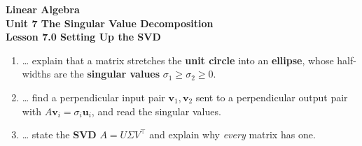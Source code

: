 \documentclass[10pt]{article}
\begin{document}
\vspace{-0.8in}

\begin{center}
  {\color{white}\textbf{\LARGE Linear Algebra}}\\[4pt]
  {\color{blushmid}\large\textbf{Unit 7 \quad The Singular Value Decomposition}}\\[6pt]
  {\color{white}\textbf{\large Lesson 7.0 \quad Setting Up the SVD}}
\end{center}

\vspace{0.22in}
\namedateperiod
\vspace{0.18in}

\begin{learningtargetbox}
\small
\begin{enumerate}[leftmargin=1.5em, itemsep=5pt]
  \item \ldots{} explain that a matrix stretches the \textbf{unit circle} into an \textbf{ellipse}, whose half-widths are the \textbf{singular values} $\sigma_1\ge\sigma_2\ge0$.
  \item \ldots{} find a perpendicular input pair $\mathbf{v}_1,\mathbf{v}_2$ sent to a perpendicular output pair with $A\mathbf{v}_i=\sigma_i\mathbf{u}_i$, and read the singular values.
  \item \ldots{} state the \textbf{SVD} $A=U\Sigma V^{\top}$ and explain why \emph{every} matrix has one.
\end{enumerate}
\end{learningtargetbox}

\vspace{0.14in}
\end{document}
